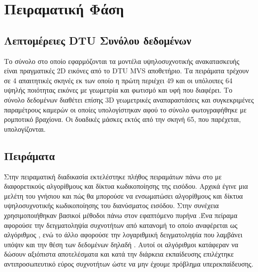\section{Πειραματική Φάση}
\label{experiments}
\subsection{Λεπτομέρειες DTU Συνόλου δεδομένων}
    Το σύνολο στο οποίο εφαρμόζονται τα μοντέλα υψηλοσυχνοτικής  ανακατασκευής είναι πραγματικές 2D εικόνες από το DTU MVS αποθετήριο\cite{aanaes2016large}. Τα πειράματα τρέχουν σε 4 απαιτητικές σκηνές εκ των οποίο η πρώτη περιέχει 49 και οι υπόλοιπες 64 υψηλής ποιότητας εικόνες με γεωμετρία και φωτισμό και υφή που διαφέρει. Το σύνολο δεδομένων διαθέτει επίσης 3D γεωμετρικές αναπαραστάσεις και συγκεκριμένες παραμέτρους καμερών οι οποίες υπολογίστηκαν αφού το σύνολο φωτογραφήθηκε με ρομποτικό βραχίονα. Οι δυαδικές μάσκες εκτός από την σκηνή 65, που παρέχεται, υπολογίζονται. 

\subsection{Πειράματα}
    Στην πειραματική διαδικασία εκτελέστηκε πλήθος πειραμάτων πάνω στο  με διαφορετικούς αλγορίθμους και δίκτυα κωδικοποίησης της εισόδου. Αρχικά έγινε μια μελέτη του γνήσιου  και πώς θα μπορούσε να ενσωματώσει αλγορίθμους και δίκτυα υψηλοσυχνοτικής κωδικοποίησης του διανύσματος εισόδου. Στην συνέχεια χρησιμοποιήθηκαν βασικοί μέθοδοι πάνω στον εφαπτόμενο πυρήνα .Ένα πείραμα αφορούσε την δειγματοληψία συχνοτήτων από  κατανομή το οποίο αναφέρεται ως αλγόριθμος , ενώ το άλλο αφορούσε την λογαριθμική δειγματοληψία που λαμβάνει υπόψιν και την θέση των δεδομένων δηλαδή . Αυτοί οι αλγόριθμοι κατάφεραν να δώσουν αξιόπιστα αποτελέσματα και κατά την διάρκεια εκπαίδευσης επιλέχτηκε αντιπροσωπευτικό εύρος συχνοτήτων ώστε να μην έχουμε πρόβλημα υπερεκπαίδευσης. 

